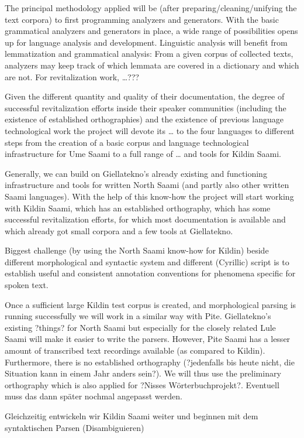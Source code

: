 \documentclass[a4paper,12pt]{article}
\begin{document}
The principal methodology applied will be (after preparing/cleaning/unifying the text corpora) to first programming analyzers and generators. With the basic grammatical analyzers and generators in place, a wide range of possibilities opens up for language analysis and development. Linguistic analysis will benefit from lemmatization and grammatical analysis: From a given corpus of collected texts, analyzers may keep track of which lemmata are covered in a dictionary and which are not. For revitalization work, …???

Given the different quantity and quality of their documentation, the degree of successful revitalization efforts inside their speaker communities (including the existence of established orthographies) and the existence of previous language technological work the project will devote its … to the four languages to different steps from the creation of a basic corpus and language technological infrastructure for Ume Saami to a full range of … and tools for Kildin Saami.

Generally, we can build on Giellatekno's already existing and functioning infrastructure and tools for written North Saami (and partly also other written Saami languages). With the help of this know-how the project will start working with Kildin Saami, which has an established orthography, which has some successful revitalization efforts, for which most documentation is available and which already got small corpora and a few tools at Giellatekno.

Biggest challenge (by using the North Saami know-how for Kildin) beside different morphological and syntactic system and different (Cyrillic) script is to establish useful and consistent annotation conventions for phenomena specific for spoken text.

Once a sufficient large Kildin test corpus is created, and morphological parsing is running successfully we will work in a similar way with Pite. Giellatekno's existing ?things? for North Saami but especially for the closely related Lule Saami will make it easier to write the parsers. However, Pite Saami has a lesser amount of transcribed text recordings available (as compared to Kildin). Furthermore, there is no established orthography (?jedenfalls bis heute nicht, die Situation kann in einem Jahr anders sein?). We will thus use the preliminary orthography which is also applied for ?Nisses Wörterbuchprojekt?. Eventuell muss das dann später nochmal angepasst werden.%

Gleichzeitig entwickeln wir Kildin Saami weiter und beginnen mit dem syntaktischen Parsen (Disambiguieren)
\end{document}
